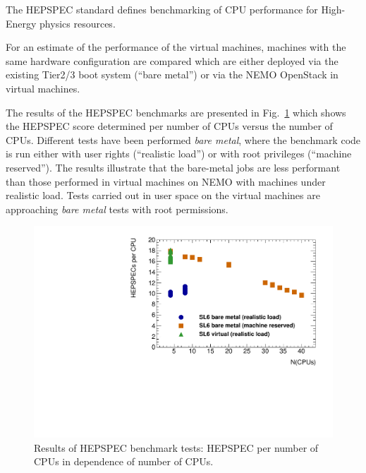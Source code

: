 The HEPSPEC standard defines benchmarking of CPU
performance for High-Energy physics resources\cite{Hepspec}.




For an estimate of the performance of the virtual machines, machines
with the same hardware configuration are compared which are either
deployed via the existing Tier2/3 boot system (``bare metal'') or via the NEMO
OpenStack in virtual machines.

The results of the HEPSPEC benchmarks are presented in
Fig.~\ref{fig:HEPSPECpCPUvsCPU-atlas} which shows the HEPSPEC score
determined per number of CPUs versus the number of CPUs.
Different tests have been performed \textit{bare metal}, where the
benchmark code is run either with user rights (``realistic load'') or
with root privileges (``machine reserved'').
The results illustrate that the bare-metal jobs are less performant
than those performed in virtual machines on NEMO with machines under
realistic load. Tests carried out
in user space on the virtual machines are approaching \textit{bare metal} tests with
root permissions.


\begin{figure}[htbp]
  \includegraphics[width=\columnwidth]{figures/HEPSPECpCPUvsCPU.pdf}
\caption{Results of HEPSPEC benchmark tests: HEPSPEC per number of
  CPUs in dependence of number of CPUs.}
\label{fig:HEPSPECpCPUvsCPU-atlas}
\end{figure}

